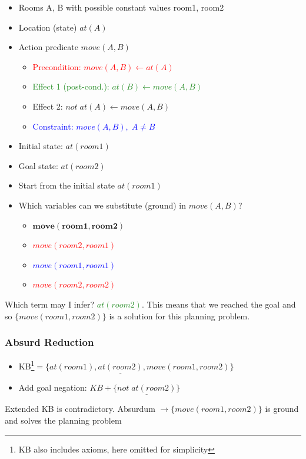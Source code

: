 \begin{minipage}[t]{0.5\textwidth}
    \begin{itemize}
        \item Rooms A, B with possible constant values room1, room2
        \item Location (state) $at(A)$
        \item Action predicate $move(A, B)$
        \begin{itemize}
            \item \textcolor{red}{Precondition: $move(A, B) \leftarrow at(A)$}
            \item \textcolor{ForestGreen}{Effect 1 (post-cond.): $at(B) \leftarrow move(A, B)$}
            \item Effect 2: $not\;at(A) \leftarrow move(A, B)$
            \item \textcolor{blue}{Constraint: $move(A, B),\;A \ne B$}
        \end{itemize}
        \item Initial state: $at(room1)$
        \item Goal state: $at(room2)$
    \end{itemize}
\end{minipage}
\begin{minipage}[t]{0.8\textwidth}
    \begin{itemize}
        \item Start from the initial state $at(room1)$
        \item Which variables can we substitute (ground) in $move(A, B)$?
        \begin{itemize}
            \item $\bm{move(room1, room2)}$
            \item \textcolor{red}{\st{$move(room2, room1)$}}
            \item \textcolor{blue}{\st{$move(room1, room1)$}}
            \item \textcolor{red}{\st{$move(room2, room2)$}}
        \end{itemize}
    \end{itemize}
\end{minipage}
\singlespacing
\vspace{0.1cm}

Which term may I infer? \textcolor{ForestGreen}{$at(room2)$}. This means that we reached the goal and so
$\{move(room1,room2)\}$ is a solution for this planning problem.

\subsubsection*{Absurd Reduction}
\begin{itemize}
    \item KB\footnote{KB also includes axioms, here omitted for simplicity}$=\{at(room1), \underline{at(room2)}, move(room1,room2)\}$
    \item Add goal negation: $KB + \{\underline{not\;at(room2)}\}$
\end{itemize}
Extended KB is contradictory.
Absurdum $\rightarrow \{move(room1,room2)\}$ is ground and solves the planning problem

